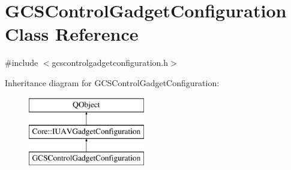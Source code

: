 \hypertarget{class_g_c_s_control_gadget_configuration}{\section{G\-C\-S\-Control\-Gadget\-Configuration Class Reference}
\label{class_g_c_s_control_gadget_configuration}
}


{\ttfamily \#include $<$gcscontrolgadgetconfiguration.\-h$>$}

Inheritance diagram for G\-C\-S\-Control\-Gadget\-Configuration\-:\begin{figure}[H]
\begin{center}
\leavevmode
\includegraphics[height=3.000000cm]{class_g_c_s_control_gadget_configuration}
\end{center}
\end{figure}
